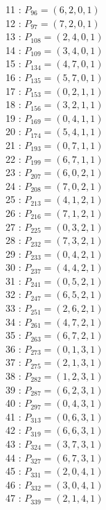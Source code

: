 \documentclass{article}
\begin{document}
{\begin{multicols}{3}
11 : $P_{96}=( 6, 2, 0, 1 )$\\
12 : $P_{97}=( 7, 2, 0, 1 )$\\
13 : $P_{108}=( 2, 4, 0, 1 )$\\
14 : $P_{109}=( 3, 4, 0, 1 )$\\
15 : $P_{134}=( 4, 7, 0, 1 )$\\
16 : $P_{135}=( 5, 7, 0, 1 )$\\
17 : $P_{153}=( 0, 2, 1, 1 )$\\
18 : $P_{156}=( 3, 2, 1, 1 )$\\
19 : $P_{169}=( 0, 4, 1, 1 )$\\
20 : $P_{174}=( 5, 4, 1, 1 )$\\
21 : $P_{193}=( 0, 7, 1, 1 )$\\
22 : $P_{199}=( 6, 7, 1, 1 )$\\
23 : $P_{207}=( 6, 0, 2, 1 )$\\
24 : $P_{208}=( 7, 0, 2, 1 )$\\
25 : $P_{213}=( 4, 1, 2, 1 )$\\
26 : $P_{216}=( 7, 1, 2, 1 )$\\
27 : $P_{225}=( 0, 3, 2, 1 )$\\
28 : $P_{232}=( 7, 3, 2, 1 )$\\
29 : $P_{233}=( 0, 4, 2, 1 )$\\
30 : $P_{237}=( 4, 4, 2, 1 )$\\
31 : $P_{241}=( 0, 5, 2, 1 )$\\
32 : $P_{247}=( 6, 5, 2, 1 )$\\
33 : $P_{251}=( 2, 6, 2, 1 )$\\
34 : $P_{261}=( 4, 7, 2, 1 )$\\
35 : $P_{263}=( 6, 7, 2, 1 )$\\
36 : $P_{273}=( 0, 1, 3, 1 )$\\
37 : $P_{275}=( 2, 1, 3, 1 )$\\
38 : $P_{282}=( 1, 2, 3, 1 )$\\
39 : $P_{287}=( 6, 2, 3, 1 )$\\
40 : $P_{297}=( 0, 4, 3, 1 )$\\
41 : $P_{313}=( 0, 6, 3, 1 )$\\
42 : $P_{319}=( 6, 6, 3, 1 )$\\
43 : $P_{324}=( 3, 7, 3, 1 )$\\
44 : $P_{327}=( 6, 7, 3, 1 )$\\
45 : $P_{331}=( 2, 0, 4, 1 )$\\
46 : $P_{332}=( 3, 0, 4, 1 )$\\
47 : $P_{339}=( 2, 1, 4, 1 )$\\

\end{multicols}}
\end{document}
